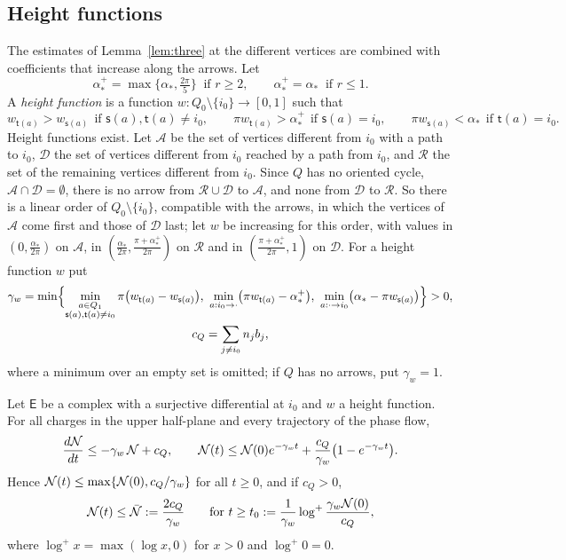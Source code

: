 \subsection{Height functions}
The estimates of Lemma~\ref{lem:three} at the different vertices are combined
with coefficients that increase along the arrows. Let
\[
 \alpha_\ast^+=\max\{\alpha_\ast,\tfrac{2\pi}5\}\ \text{ if }r\geq2,\qquad
 \alpha_\ast^+=\alpha_\ast\ \text{ if }r\leq1 .
\]
A \emph{height function} is a function $w:Q_0\setminus\{i_0\}\to[0,1]$ such
that
\[
 w_{\mathsf t(a)}>w_{\mathsf s(a)}\ \ \text{if }\mathsf s(a),\mathsf t(a)\neq i_0,\qquad
 \pi w_{\mathsf t(a)}>\alpha_\ast^+\ \ \text{if }\mathsf s(a)=i_0,\qquad
 \pi w_{\mathsf s(a)}<\alpha_\ast\ \ \text{if }\mathsf t(a)=i_0 .
\]
Height functions exist. Let $\mathcal A$ be the set of vertices different from $i_0$
with a path to $i_0$, $\mathcal D$ the set of vertices different from $i_0$
reached by a path from $i_0$, and $\mathcal R$ the set of the remaining
vertices different from $i_0$. Since $Q$ has no oriented cycle,
$\mathcal A\cap\mathcal D=\emptyset$, there is no arrow from
$\mathcal R\cup\mathcal D$ to $\mathcal A$, and none from $\mathcal D$ to
$\mathcal R$. So there is a linear order of $Q_0\setminus\{i_0\}$, compatible
with the arrows, in which the vertices of $\mathcal A$ come first and those
of $\mathcal D$ last; let $w$ be increasing for this order, with values in
$(0,\frac{\alpha_\ast}{2\pi})$ on $\mathcal A$, in
$(\frac{\alpha_\ast}{2\pi},\frac{\pi+\alpha_\ast^+}{2\pi})$ on $\mathcal R$ and in
$(\frac{\pi+\alpha_\ast^+}{2\pi},1)$ on $\mathcal D$. For a height function
$w$ put
\begin{equation}\label{eq:rhoQ}
 \begin{gathered}
 \gamma_w=\min\Bigl\{\min_{\substack{a\in Q_1\\\mathsf s(a),\mathsf t(a)\neq i_0}}\pi\bigl(w_{\mathsf t(a)}-w_{\mathsf s(a)}\bigr),\
 \min_{a:i_0\to\cdot}\bigl(\pi w_{\mathsf t(a)}-\alpha_\ast^+\bigr),\
 \min_{a:\cdot\to i_0}\bigl(\alpha_\ast-\pi w_{\mathsf s(a)}\bigr)\Bigr\}>0,\\
 c_Q=\sum_{j\neq i_0}n_jb_j,
 \end{gathered}
\end{equation}
where a minimum over an empty set is omitted; if $Q$ has no arrows, put
$\gamma_w=1$.

\begin{theorem}\label{thm:energy}
Let $\mathsf E$ be a complex with a surjective differential at $i_0$ and
$w$ a height function. For all charges in the upper half-plane and every
trajectory of the phase flow,
\[
 \frac{d\mathcal N}{dt}\leq-\gamma_w\,\mathcal N+c_Q,\qquad
 \mathcal N(t)\leq\mathcal N(0)e^{-\gamma_wt}+\frac{c_Q}{\gamma_w}\bigl(1-e^{-\gamma_wt}\bigr).
\]
Hence $\mathcal N(t)\leq\max\{\mathcal N(0),c_Q/\gamma_w\}$ for all $t\geq0$, and if $c_Q>0$,
\[
 \mathcal N(t)\leq\bar{\mathcal N}:=\frac{2c_Q}{\gamma_w}\qquad\text{for }t\geq
 t_0:=\frac1{\gamma_w}\log^+\frac{\gamma_w\mathcal N(0)}{c_Q},
\]
where $\log^+x=\max(\log x,0)$ for $x>0$ and $\log^+0=0$.
\end{theorem}

